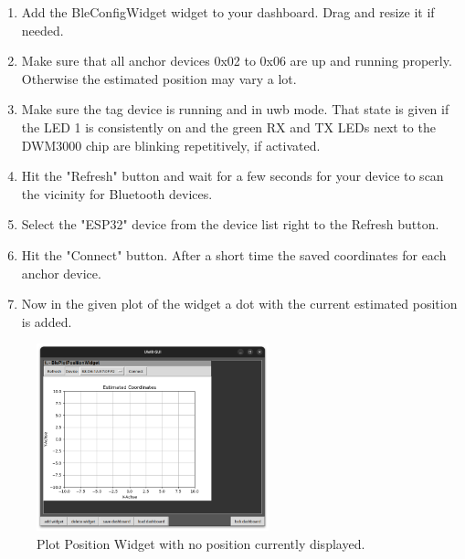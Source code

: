 \begin{enumerate}
	\item Add the BleConfigWidget widget to your dashboard. Drag and resize it if needed. 
	\item Make sure that all anchor devices 0x02 to 0x06 are up and running properly. Otherwise the estimated position may vary a lot. 
	\item Make sure the tag device is running and in uwb mode. That state is given if the LED 1 is consistently on and the green RX and TX LEDs next to the DWM3000 chip are blinking repetitively, if activated. 
	\item Hit the "Refresh" button and wait for a few seconds for your device to scan the vicinity for Bluetooth devices. 
	\item Select the "ESP32" device from the device list right to the Refresh button. 
	\item Hit the "Connect" button. After a short time the saved coordinates for each anchor device. 
	\item Now in the given plot of the widget a dot with the current estimated position is added. 
\end{enumerate}

\begin{figure}[!hbt]
	\centering
	\includegraphics[width=0.6\textwidth]{pictures/coordinate_plot.png}
	\caption{Plot Position Widget with no position currently displayed.}
	\label{fig:coordinate_plot}
\end{figure}
